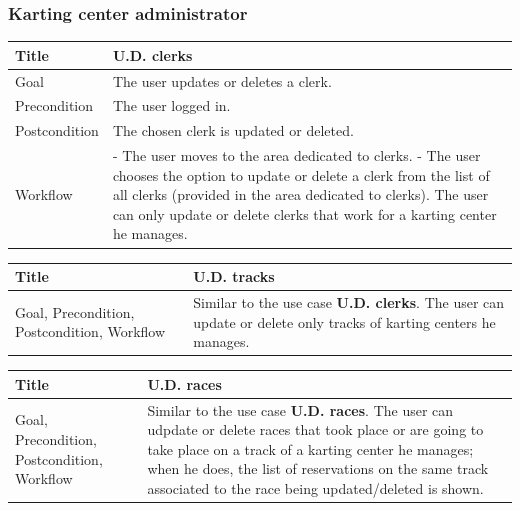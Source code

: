 \documentclass{beamer}
\begin{document}
\begin{frame}
    \frametitle{Karting center administrator}
    \begin{table}
        \tiny
        \begin{tabular}{|p{2cm}|p{6cm}|}
        \hline  
        Title & \textbf{U.D. clerks} \\
        \hline
        Goal & The user updates or deletes a clerk. \\
        \hline
        Precondition & The user logged in. \\
        \hline
        Postcondition & The chosen clerk is updated or deleted. \\
        \hline
        Workflow &
        - The user moves to the area dedicated to clerks. \newline
        - The user chooses the option to update or delete a clerk from
        the list of all clerks (provided in the area dedicated to clerks). 
        The user can only update or delete clerks that work for a karting center he manages.\\
        \hline
        \end{tabular}
\end{table}

\begin{table}
    \tiny
    \begin{tabular}{|p{2cm}|p{6cm}|}
    \hline  
    Title & \textbf{U.D. tracks} \\
    \hline
    Goal, Precondition, Postcondition, Workflow & Similar to the use case \textbf{U.D. clerks}.
    The user can update or delete only tracks of karting centers he manages.\\
    \hline
    \end{tabular}
\end{table}

\begin{table}
    \tiny
    \begin{tabular}{|p{2cm}|p{6cm}|}
    \hline  
    Title & \textbf{U.D. races} \\
    \hline
    Goal, Precondition, Postcondition, Workflow & Similar to the use case \textbf{U.D. races}.
    The user can udpdate or delete races that took place or are going to take place on a track 
    of a karting center he manages; when he does, the list of reservations on the same track 
    associated to the race being updated/deleted is shown.\\
    \hline
    \end{tabular}
\end{table}
\end{frame}
\end{document}
